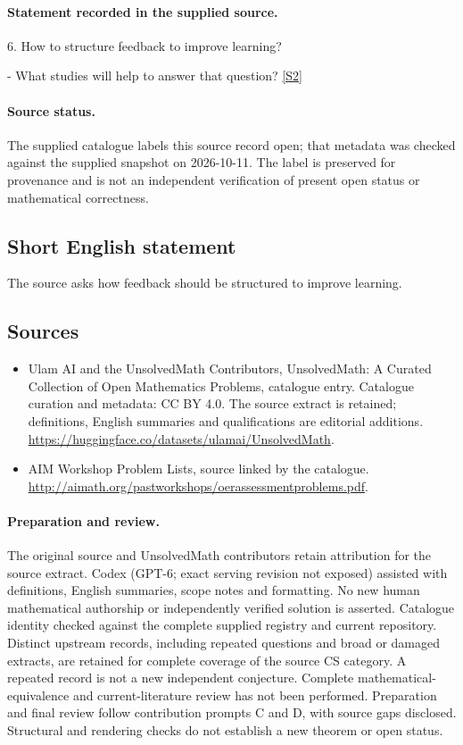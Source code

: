 \documentclass[11pt]{article}
\begin{document}
\paragraph{Statement recorded in the supplied source.}
6. How to structure feedback to improve learning?

- What studies will help to answer that question? \href{http://aimath.org/pastworkshops/oerassessmentproblems.pdf}{[S2]}
\paragraph{Source status.}
The supplied catalogue labels this source record open; that metadata was checked against the supplied snapshot on 2026-10-11. The label is preserved for provenance and is not an independent verification of present open status or mathematical correctness.
\subsection{Short English statement}
The source asks how feedback should be structured to improve learning.
\subsection{Sources}
\begin{itemize}
\item[S1] Ulam AI and the UnsolvedMath Contributors, UnsolvedMath: A Curated Collection of Open Mathematics Problems, catalogue entry. Catalogue curation and metadata: CC BY 4.0. The source extract is retained; definitions, English summaries and qualifications are editorial additions.
\url{https://huggingface.co/datasets/ulamai/UnsolvedMath}.
\item[S2] AIM Workshop Problem Lists, source linked by the catalogue.
\url{http://aimath.org/pastworkshops/oerassessmentproblems.pdf}.
\end{itemize}
\paragraph{Preparation and review.}
The original source and UnsolvedMath contributors retain attribution for the source extract. Codex (GPT-6; exact serving revision not exposed) assisted with definitions, English summaries, scope notes and formatting. No new human mathematical authorship or independently verified solution is asserted. Catalogue identity checked against the complete supplied registry and current repository. Distinct upstream records, including repeated questions and broad or damaged extracts, are retained for complete coverage of the source CS category. A repeated record is not a new independent conjecture. Complete mathematical-equivalence and current-literature review has not been performed. Preparation and final review follow contribution prompts C and D, with source gaps disclosed. Structural and rendering checks do not establish a new theorem or open status.
\label{end:statement}
\end{document}
